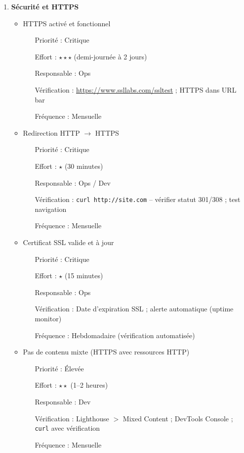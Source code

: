 \documentclass[12pt,a4paper,twoside]{report}
\begin{document}
\begin{enumerate}
    \item \textbf{Sécurité et HTTPS}
    \begin{itemize}
        \item HTTPS activé et fonctionnel
        \begin{itemize}
            \item[Priorité :] Critique
            \item[Effort :] $\star\star\star$ (demi-journée à 2 jours)
            \item[Responsable :] Ops
            \item[Vérification :] \url{https://www.ssllabs.com/ssltest} ; HTTPS dans URL bar
            \item[Fréquence :] Mensuelle
        \end{itemize}
        \item Redirection HTTP $\rightarrow$ HTTPS
        \begin{itemize}
            \item[Priorité :] Critique
            \item[Effort :] $\star$ (30 minutes)
            \item[Responsable :] Ops / Dev
            \item[Vérification :] \texttt{curl http://site.com} -- vérifier statut 301/308 ; test navigation
            \item[Fréquence :] Mensuelle
        \end{itemize}
        \item Certificat SSL valide et à jour
        \begin{itemize}
            \item[Priorité :] Critique
            \item[Effort :] $\star$ (15 minutes)
            \item[Responsable :] Ops
            \item[Vérification :] Date d'expiration SSL ; alerte automatique (uptime monitor)
            \item[Fréquence :] Hebdomadaire (vérification automatisée)
        \end{itemize}
        \item Pas de contenu mixte (HTTPS avec ressources HTTP)
        \begin{itemize}
            \item[Priorité :] Élevée
            \item[Effort :] $\star\star$ (1--2 heures)
            \item[Responsable :] Dev
            \item[Vérification :] Lighthouse $>$ Mixed Content ; DevTools Console ; \texttt{curl} avec vérification
            \item[Fréquence :] Mensuelle
        \end{itemize}
    \end{itemize}


\end{enumerate}
\end{document}
